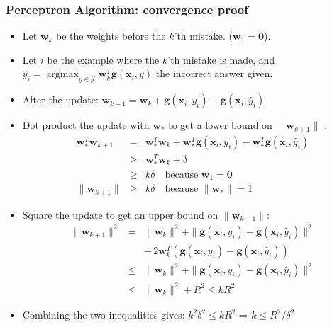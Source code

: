 \documentclass[ignorenonframetext,plain,fleqn]{beamer}
\DeclareMathOperator*{\argmax}{argmax}
\renewcommand{\vec}{\mathbf}
\begin{document}
\begin{frame}\frametitle{Perceptron Algorithm: convergence proof}
\small
\begin{itemize}
\item Let $\vec{w}_k$ be the weights before the $k$'th mistake.
  ($\vec{w}_1 = \vec{0}$).
\item Let $i$ be the example where the $k$'th mistake is made, and
  $\hat{y}_i = \argmax_{y\in\mathcal{Y}} \vec{w}_k^T \vec{g}(\vec{x}_i,y)$
  the incorrect answer given.
\item After the update: $\vec{w}_{k+1} = \vec{w}_k + \vec{g}(\vec{x}_i,y_i) -
  \vec{g}(\vec{x}_i,\hat{y}_i)$
\item Dot product the update with $\vec{w}_*$ to get a lower bound on
  $\|\vec{w}_{k+1}\|$ :\begin{eqnarray*} 
\vec{w}_*^T \vec{w}_{k+1} &=& \vec{w}_*^T \vec{w}_k + \vec{w}_*^T
  \vec{g}(\vec{x}_i,y_i) - \vec{w}_*^T \vec{g}(\vec{x}_i,\hat{y}_i) \\
 &\geq& \vec{w}_*^T \vec{w}_k + \delta \\
 &\geq& k \delta 
  \quad\text{because } \vec{w}_1=\vec{0} \\
\|\vec{w}_{k+1}\| &\geq& k \delta 
  \quad\text{because } \|\vec{w}_*\|=1
\end{eqnarray*} 
\item Square the update to get an upper bound on
  $\|\vec{w}_{k+1}\|$: \begin{eqnarray*}
\|\vec{w}_{k+1}\|^2 &=& \|\vec{w}_k\|^2 + \|\vec{g}(\vec{x}_i,y_i) -
  \vec{g}(\vec{x}_i,\hat{y}_i)\|^2 \\
  && +\, 2 \vec{w}_k^T (\vec{g}(\vec{x}_i,y_i) -
  \vec{g}(\vec{x}_i,\hat{y}_i)) \\
&\leq& \|\vec{w}_k\|^2 + \|\vec{g}(\vec{x}_i,y_i) -
  \vec{g}(\vec{x}_i,\hat{y}_i)\|^2 \\
&\leq& \|\vec{w}_k\|^2 + R^2 \leq k R^2
\end{eqnarray*}
\item Combining the two inequalities gives: $ k^2 \delta^2 \leq k R^2
  \Rightarrow k \leq R^2 / \delta^2 $
\end{itemize}
\end{frame}
\end{document}
